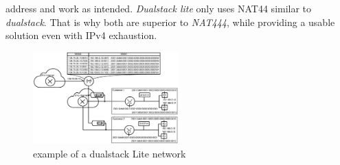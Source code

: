 \documentclass[format=sigconf, natbib=true, nonacm=true]{acmart}
\begin{document}
address and work as intended. \textit{Dualstack lite} only uses NAT44 similar to \textit{dualstack}. That is why both are superior to \textit{NAT444}, while providing a usable solution even with IPv4 exhaustion\cite{Hughes2022_C08}.
    \begin{figure}
        \centering
        \includegraphics[width=0.5\textwidth]{images/dualstack_lite_network.png}
        \caption{example of a dualstack Lite network}
        \label{fig:dualstack_lite_network}
    \end{figure}
\end{document}
